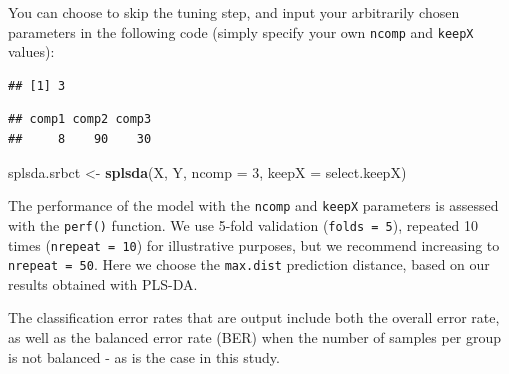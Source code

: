 \documentclass[]{book}
\newenvironment{Shaded}{\begin{snugshade}}{\end{snugshade}}
\newcommand{\KeywordTok}[1]{\textcolor[rgb]{0.13,0.29,0.53}{\textbf{#1}}}
\newcommand{\DataTypeTok}[1]{\textcolor[rgb]{0.13,0.29,0.53}{#1}}
\newcommand{\DecValTok}[1]{\textcolor[rgb]{0.00,0.00,0.81}{#1}}
\newcommand{\StringTok}[1]{\textcolor[rgb]{0.31,0.60,0.02}{#1}}
\newcommand{\CommentTok}[1]{\textcolor[rgb]{0.56,0.35,0.01}{\textit{#1}}}
\newcommand{\OperatorTok}[1]{\textcolor[rgb]{0.81,0.36,0.00}{\textbf{#1}}}
\newcommand{\NormalTok}[1]{#1}
\begin{document}
You can choose to skip the tuning step, and input your arbitrarily
chosen parameters in the following code (simply specify your own
\texttt{ncomp} and \texttt{keepX} values):

\begin{Shaded}
\end{Shaded}

\begin{verbatim}
## [1] 3
\end{verbatim}

\begin{Shaded}
\end{Shaded}

\begin{verbatim}
## comp1 comp2 comp3 
##     8    90    30
\end{verbatim}

\begin{Shaded}
\begin{Highlighting}[]
\NormalTok{splsda.srbct <-}\StringTok{ }\KeywordTok{splsda}\NormalTok{(X, Y, }\DataTypeTok{ncomp =} \DecValTok{3}\NormalTok{, }\DataTypeTok{keepX =}\NormalTok{ select.keepX) }
\end{Highlighting}
\end{Shaded}

The performance of the model with the \texttt{ncomp} and \texttt{keepX}
parameters is assessed with the \texttt{perf()} function. We use 5-fold
validation (\texttt{folds\ =\ 5}), repeated 10 times
(\texttt{nrepeat\ =\ 10}) for illustrative purposes, but we recommend
increasing to \texttt{nrepeat\ =\ 50}. Here we choose the
\texttt{max.dist} prediction distance, based on our results obtained
with PLS-DA.

The classification error rates that are output include both the overall
error rate, as well as the balanced error rate (BER) when the number of
samples per group is not balanced - as is the case in this study.
\end{document}
